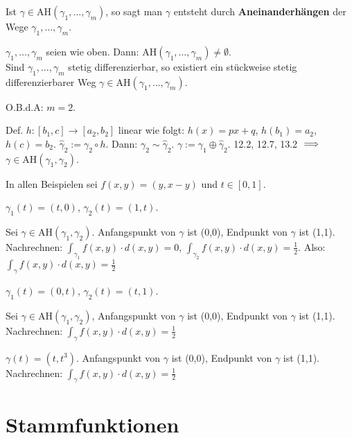 \documentclass[a4paper,twoside,DIV15,BCOR12mm]{scrbook}
\begin{document}
Ist $\gamma\in \text{AH}(\gamma_1,\ldots,\gamma_m)$, so sagt man $\gamma$ entsteht durch \textbf{Aneinanderhängen} der Wege $\gamma_1,\ldots,\gamma_m$.

\begin{satz}
$\gamma_1,\ldots,\gamma_m$ seien wie oben. Dann: $\text{AH}(\gamma_1,\ldots,\gamma_m) \ne \emptyset$. \\
Sind $\gamma_1,\ldots,\gamma_m$ stetig differenzierbar, so existiert ein stückweise stetig differenzierbarer Weg $\gamma\in \text{AH}(\gamma_1,\ldots,\gamma_m)$.
\end{satz}

\begin{beweis}
O.B.d.A: $m=2$.

Def. $h:[b_1,c] \to [a_2,b_2]$ linear wie folgt: $h(x)=px+q$, $h(b_1)=a_2$, $h(c)=b_2$. $\hat\gamma_2 := \gamma_2\circ h$. Dann: $\gamma_2\sim \hat\gamma_2$. $\gamma := \gamma_1\oplus\hat\gamma_2$. 12.2, 12.7, 13.2 $\implies$ $\gamma\in \text{AH}(\gamma_1,\gamma_2)$.
\end{beweis}

\begin{beispiel}
In allen Beispielen sei $f(x,y)=(y,x-y)$ und $t\in[0,1]$.
\begin{liste}
\item $\gamma_1(t)=(t,0)$, $\gamma_2(t)=(1,t)$.

Sei $\gamma \in \text{AH}(\gamma_1,\gamma_2)$. Anfangspunkt von $\gamma$ ist (0,0), Endpunkt von $\gamma$ ist (1,1). Nachrechnen: $\int_{\gamma_1}f(x,y)\cdot d(x,y) = 0$, $\int_{\gamma_2}f(x,y)\cdot d(x,y) = \frac{1}{2}$. Also: $\int_\gamma f(x,y) \cdot d(x,y) = \frac{1}{2}$

\item $\gamma_1(t) = (0,t)$, $\gamma_2(t)=(t,1)$.

Sei $\gamma\in \text{AH}(\gamma_1,\gamma_2)$, Anfangspunkt von $\gamma$ ist (0,0), Endpunkt von $\gamma$ ist (1,1). Nachrechnen: $\int_{\gamma}f(x,y)\cdot d(x,y) = \frac{1}{2}$

\item $\gamma(t)=(t,t^3)$. Anfangspunkt von $\gamma$ ist (0,0), Endpunkt von $\gamma$ ist (1,1). Nachrechnen: $\int_\gamma f(x,y)\cdot d(x,y) = \frac{1}{2}$
\end{liste}
\end{beispiel}

\chapter{Stammfunktionen}
\end{document}
